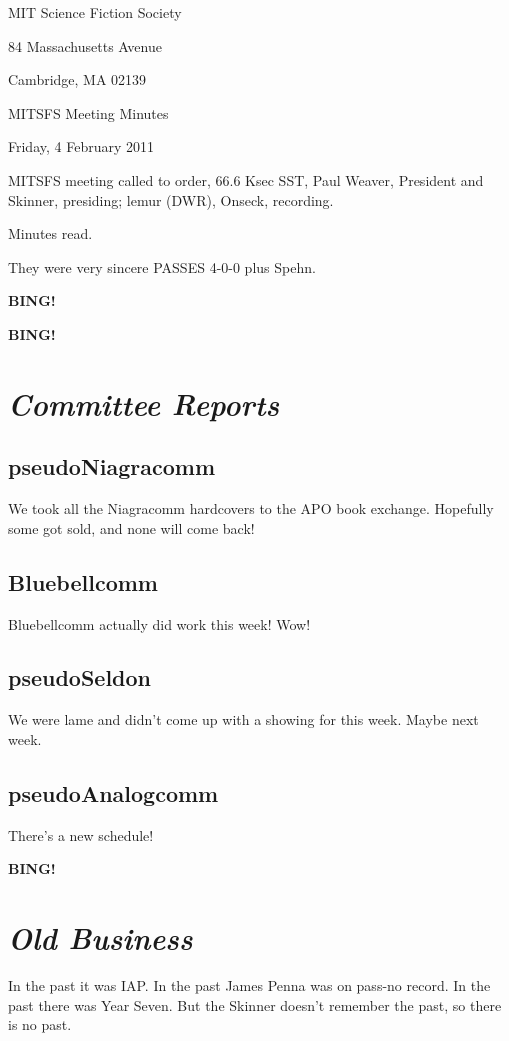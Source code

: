 \documentclass[10pt]{article}
\newcommand{\bing}{{\bf BING!} }
\newcommand{\goto}[1]{\bing \vskip 12pt \section*{{\em{#1}}}}
\newcommand{\ps}{ plus Spehn\xspace}
\newcommand{\skinner}{Paul Weaver, President and Skinner}
\newcommand{\onseck}{lemur (DWR), Onseck}
\newcommand{\meetingdate}{Friday, 4 February 2011}
\begin{document}
\begin{center}

MIT Science Fiction Society

84 Massachusetts Avenue

Cambridge, MA 02139

\vspace{12pt}

MITSFS Meeting Minutes

\meetingdate

\end{center}

\vspace{18pt}

\setlength{\parskip}{6pt}

\noindent
MITSFS meeting called to order, 66.6 Ksec SST,
\skinner, presiding; \onseck, recording.

Minutes read.

They were very sincere PASSES 4-0-0\ps.

\bing

\goto{Committee Reports}

\subsection*{pseudoNiagracomm}

We took all the Niagracomm hardcovers to the APO book exchange.  Hopefully
some got sold, and none will come back!


\subsection*{Bluebellcomm}

Bluebellcomm actually did work this week!  Wow!


\subsection*{pseudoSeldon}

We were lame and didn't come up with a showing for this week.  Maybe
next week.


\subsection*{pseudoAnalogcomm}

There's a new schedule!


\goto{Old Business}

In the past it was IAP.  In the past James Penna was on pass-no record.  In
the past there was Year Seven.  But the Skinner doesn't remember the past,
so there is no past.
\end{document}
